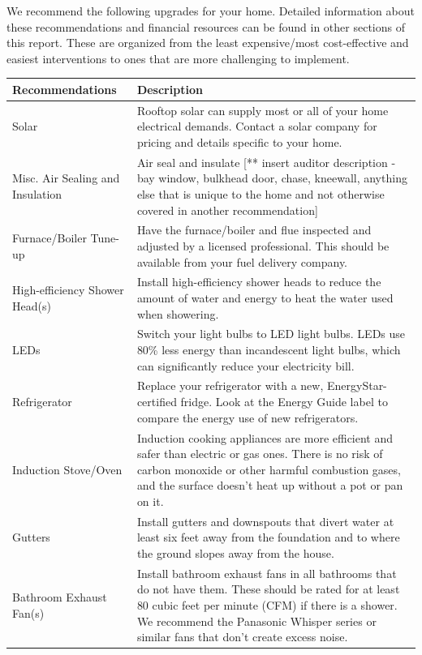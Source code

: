 \documentclass[
  letterpaper,
  DIV=11,
  numbers=noendperiod]{scrartcl}
\begin{document}
We recommend the following upgrades for your home. Detailed information
about these recommendations and financial resources can be found in
other sections of this report. These are organized from the least
expensive/most cost-effective and easiest interventions to ones that are
more challenging to implement.

\begin{table}
\fontsize{12.0pt}{14.4pt}\selectfont
\begin{tabular*}{1\linewidth}{@{\extracolsep{\fill}}>{\raggedright\arraybackslash}p{\dimexpr 150.00pt -2\tabcolsep-1.5\arrayrulewidth}>{\raggedright\arraybackslash}p{\dimexpr 337.50pt -2\tabcolsep-1.5\arrayrulewidth}}
\toprule
Recommendations & Description \\ 
\midrule\addlinespace[2.5pt]
Solar & Rooftop solar can supply most or all of your home electrical demands. Contact a solar company for pricing and details specific to your home. \\ 
Misc. Air Sealing and Insulation & Air seal and insulate [** insert auditor description - bay window, bulkhead door, chase, kneewall, anything else that is unique to the home and not otherwise covered in another recommendation] \\ 
Furnace/Boiler Tune-up & Have the furnace/boiler and flue inspected and adjusted by a licensed professional. This should be available from your fuel delivery company. \\ 
High-efficiency Shower Head(s) & Install high-efficiency shower heads to reduce the amount of water and energy to heat the water used when showering. \\ 
LEDs & Switch your light bulbs to LED light bulbs. LEDs use 80\% less energy than incandescent light bulbs, which can significantly reduce your electricity bill. \\ 
Refrigerator & Replace your refrigerator with a new, EnergyStar-certified fridge. Look at the Energy Guide label to compare the energy use of new refrigerators. \\ 
Induction Stove/Oven & Induction cooking appliances are more efficient and safer than electric or gas ones. There is no risk of carbon monoxide or other harmful combustion gases, and the surface doesn’t heat up without a pot or pan on it. \\ 
Gutters & Install gutters and downspouts that divert water at least six feet away from the foundation and to where the ground slopes away from the house. \\ 
Bathroom Exhaust Fan(s) & Install bathroom exhaust fans in all bathrooms that do not have them. These should be rated for at least 80 cubic feet per minute (CFM) if there is a shower. We recommend the Panasonic Whisper series or similar fans that don’t create excess noise. \\ 

\end{tabular*}
\end{table}
\end{document}
